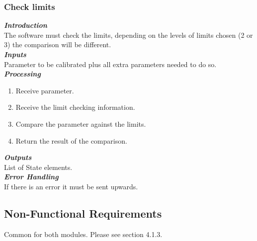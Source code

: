 \subsubsection{Check limits}

\textbf{\emph{Introduction}}\\
The software must check the limits, depending on the levels of limits chosen (2 or 3) the comparison will be different.\\


\textbf{\emph{Inputs}}\\
Parameter to be calibrated plus all extra parameters needed to do so.\\
\newpage
\textbf{\emph{Processing}}\\
\begin{enumerate}
\item Receive parameter.
\item Receive the limit checking information.
\item Compare the parameter against the limits.
\item Return the result of the comparison.
\end{enumerate}
\vspace*{1\baselineskip}
\textbf{\emph{Outputs}}\\
List of State elements.\\


\textbf{\emph{Error Handling}}\\
If there is an error it must be sent upwards.


\subsection{Non-Functional Requirements}

Common for both modules. Please see section 4.1.3.



\newpage

